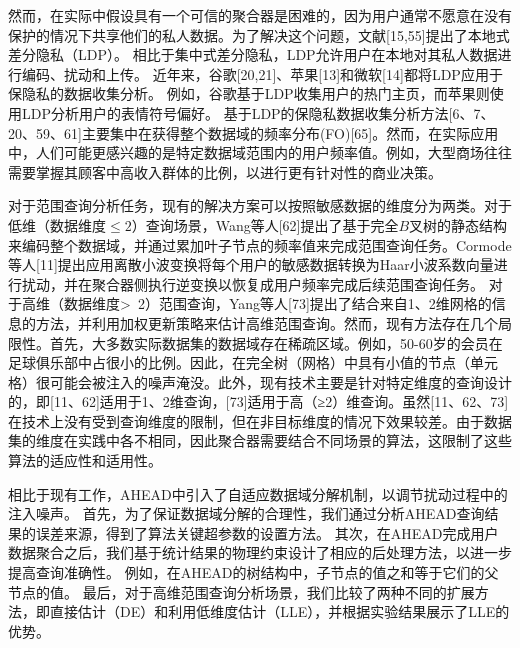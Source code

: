 然而，在实际中假设具有一个可信的聚合器是困难的，因为用户通常不愿意在没有保护的情况下共享他们的私人数据。为了解决这个问题，文献[15,55]提出了本地式差分隐私（LDP）。
相比于集中式差分隐私，LDP允许用户在本地对其私人数据进行编码、扰动和上传。
近年来，谷歌[20,21]、苹果[13]和微软[14]都将LDP应用于保隐私的数据收集分析。
例如，谷歌基于LDP收集用户的热门主页，而苹果则使用LDP分析用户的表情符号偏好。
基于LDP的保隐私数据收集分析方法[6、7、20、59、61]主要集中在获得整个数据域的频率分布(FO)[65]。然而，在实际应用中，人们可能更感兴趣的是特定数据域范围内的用户频率值。例如，大型商场往往需要掌握其顾客中高收入群体的比例，以进行更有针对性的商业决策。

对于范围查询分析任务，现有的解决方案可以按照敏感数据的维度分为两类。对于低维（数据维度$\leq 2$）查询场景，Wang等人[62]提出了基于完全$B$叉树的静态结构来编码整个数据域，并通过累加叶子节点的频率值来完成范围查询任务。Cormode等人[11]提出应用离散小波变换将每个用户的敏感数据转换为Haar小波系数向量进行扰动，并在聚合器侧执行逆变换以恢复成用户频率完成后续范围查询任务。
对于高维（数据维度\textgreater~2）范围查询，Yang等人[73]提出了结合来自1、2维网格的信息的方法，并利用加权更新策略来估计高维范围查询。然而，现有方法存在几个局限性。首先，大多数实际数据集的数据域存在稀疏区域。例如，50-60岁的会员在足球俱乐部中占很小的比例。因此，在完全树（网格）中具有小值的节点（单元格）很可能会被注入的噪声淹没。此外，现有技术主要是针对特定维度的查询设计的，即[11、62]适用于1、2维查询，[73]适用于高（≥2）维查询。虽然[11、62、73]在技术上没有受到查询维度的限制，但在非目标维度的情况下效果较差。由于数据集的维度在实践中各不相同，因此聚合器需要结合不同场景的算法，这限制了这些算法的适应性和适用性。


相比于现有工作，AHEAD中引入了自适应数据域分解机制，以调节扰动过程中的注入噪声。
首先，为了保证数据域分解的合理性，我们通过分析AHEAD查询结果的误差来源，得到了算法关键超参数的设置方法。
其次，在AHEAD完成用户数据聚合之后，我们基于统计结果的物理约束设计了相应的后处理方法，以进一步提高查询准确性。
例如，在AHEAD的树结构中，子节点的值之和等于它们的父节点的值。
最后，对于高维范围查询分析场景，我们比较了两种不同的扩展方法，即直接估计（DE）和利用低维度估计（LLE），并根据实验结果展示了LLE的优势。

